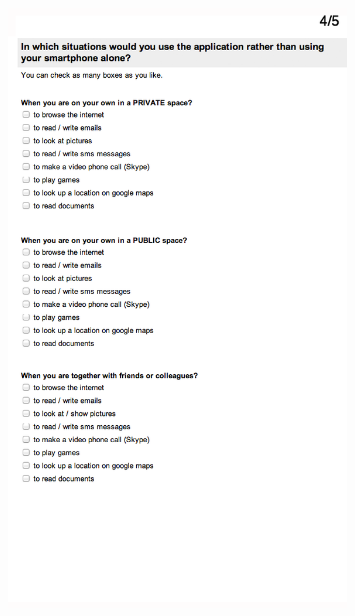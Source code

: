 \begin{figure}[htb]
  \centering
    \includegraphics[width=0.8\textwidth]{images/evalform2d}
\end{figure}

